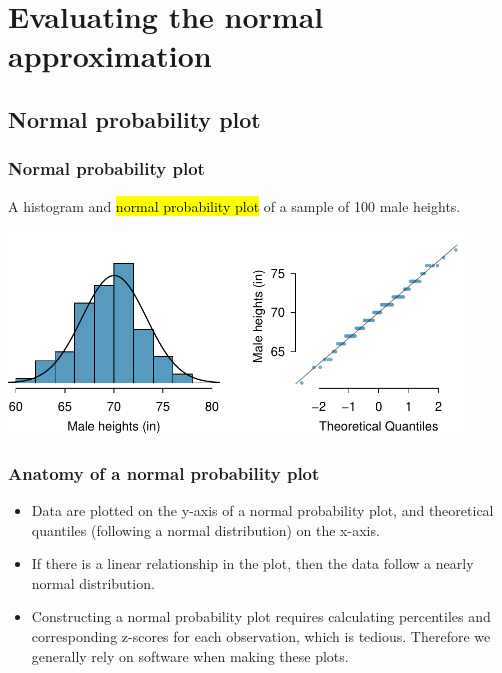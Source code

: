 
\section{Evaluating the normal approximation}


\subsection{Normal probability plot}


\begin{frame}
\frametitle{Normal probability plot}

A histogram and \hl{normal probability plot} of a sample of 100 male heights.

\begin{center}
\includegraphics[width=0.9\textwidth]{4-2_evaluating_normal_approx/figures/fcidMHeights/fcidMHeights}
\end{center}

\end{frame}


\begin{frame}
\frametitle{Anatomy of a normal probability plot}

\begin{itemize}

\item Data are plotted on the y-axis of a normal probability plot, and theoretical quantiles (following a normal distribution) on the x-axis.

\item If there is a linear relationship in the plot, then the data follow a nearly normal distribution.

\item Constructing a normal probability plot requires calculating percentiles and corresponding z-scores for each observation, which is tedious. Therefore we generally rely on software when making these plots.

\end{itemize}

\end{frame}

